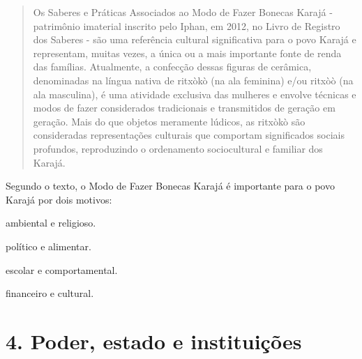 \begin{quote}
Os Saberes e Práticas Associados ao Modo de Fazer Bonecas Karajá -
patrimônio imaterial inscrito pelo Iphan, em 2012, no Livro de Registro
dos Saberes - são uma referência cultural significativa para o povo
Karajá e representam, muitas vezes, a única ou a mais importante fonte
de renda das famílias. Atualmente, a confecção dessas figuras de
cerâmica, denominadas na língua nativa de ritxòkò (na ala feminina) e/ou
ritxòò (na ala masculina), é uma atividade exclusiva das mulheres e
envolve técnicas e modos de fazer considerados tradicionais e
transmitidos de geração em geração. Mais do que objetos meramente
lúdicos, as ritxòkò são consideradas representações culturais que
comportam significados sociais profundos, reproduzindo o ordenamento
sociocultural e familiar dos Karajá.
\end{quote}

Segundo o texto, o Modo de Fazer Bonecas Karajá é importante para o povo
Karajá por dois motivos:

\begin{escolha}
\item ambiental e religioso.

\item político e alimentar.

\item escolar e comportamental.

\item financeiro e cultural.
\end{escolha}


\chapter{4. Poder, estado e instituições}


